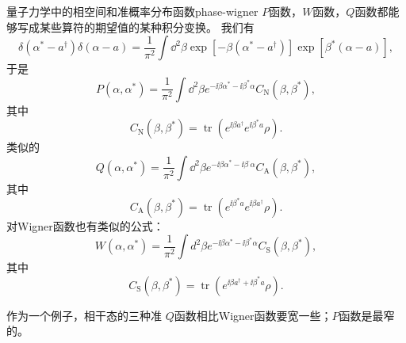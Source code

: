\begin{back}{量子力学中的相空间和准概率分布函数}{phase-wigner}
    $P$函数，$W$函数，$Q$函数都能够写成某些算符的期望值的某种积分变换。
    我们有
    \begin{equation}
        \delta\left(\alpha^{*}-a^{\dagger}\right) \delta(\alpha-a) =\frac{1}{\pi^{2}} \int \dd^{2} \beta \exp \left[-\beta\left(\alpha^{*}-a^{\dagger}\right)\right] \exp \left[\beta^{*}(\alpha-a)\right],
    \end{equation}
    于是
    \begin{equation}
        P\left(\alpha, \alpha^{*}\right)=\frac{1}{\pi^{2}} \int \dd^{2} \beta e^{- \ii \beta \alpha^{*}- \ii \beta^{*} \alpha} C_\text{N}\left(\beta, \beta^{*}\right),
    \end{equation}
    其中
    \begin{equation}
        C_\text{N}\left(\beta, \beta^{*}\right)=\operatorname{tr}\left(e^{\ii \beta a^{\dagger}} e^{\ii \beta^{*} a} \rho\right).
    \end{equation}
    类似的
    \begin{equation}
        Q\left(\alpha, \alpha^{*}\right)=\frac{1}{\pi^{2}} \int \dd^{2} \beta e^{- \ii \beta \alpha^{*}- \ii \beta^{\cdot} \alpha} C_\text{A}\left(\beta, \beta^{*}\right),
    \end{equation}
    其中
    \begin{equation}
        C_\text{A}\left(\beta, \beta^{*}\right)=\operatorname{tr}\left(e^{\ii \beta^{*} a} e^{\ii \beta a^{\dagger}} \rho\right).
    \end{equation}
    对Wigner函数也有类似的公式：
    \begin{equation}
        W\left(\alpha, \alpha^{*}\right)=\frac{1}{\pi^{2}} \int d^{2} \beta e^{-\ii \beta \alpha^{*}- \ii \beta^{*} \alpha} C_\text{S}\left(\beta, \beta^{*}\right),
    \end{equation}
    其中
    \begin{equation}
        C_\text{S}\left(\beta, \beta^{*}\right)=\operatorname{tr}\left(e^{\ii \beta a^{\dagger}+ \ii \beta^{*} a} \rho\right).
    \end{equation}

    作为一个例子，相干态的三种准
    $Q$函数相比Wigner函数要宽一些；$P$函数是最窄的。
\end{back}